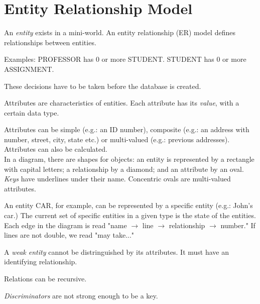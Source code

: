\documentclass[english]{exam}
\begin{document}
	
    \section{Entity Relationship Model}
    
    An \textit{entity} exists in a mini-world. An entity relationship (ER) model defines relationships between entities.
     
    Examples: PROFESSOR has 0 or more STUDENT. STUDENT has 0 or more ASSIGNMENT.
     
    These decisions have to be taken before the database is created.
     
    Attributes are characteristics of entities. Each attribute has its \textit{value}, with a certain data type.
    
    Attributes can be simple (e.g.: an ID number), composite (e.g.: an address with number, street, city, state etc.) or multi-valued (e.g.: previous addresses). Attributes can also be calculated.\\
    
    In a diagram, there are shapes for objects: an entity is represented by a rectangle with capital letters; a relationship by a diamond; and an attribute by an oval. \textit{Keys} have underlines under their name. Concentric ovals are multi-valued attributes.

    An entity CAR, for example, can be represented by a specific entity (e.g.: John's car.) The current set of specific entities in a given type is the state of the entities.\\
    
    Each edge in the diagram is read "name $\rightarrow$ line $\rightarrow$ relationship $\rightarrow$ number." If lines are not double, we read "may take..."
    
    A \textit{weak entity} cannot be distringuished by its attributes. It must have an identifying relationship.
    
    Relations can be recursive.
    
    \textit{Discriminators} are not strong enough to be a key.
     
\end{document}
